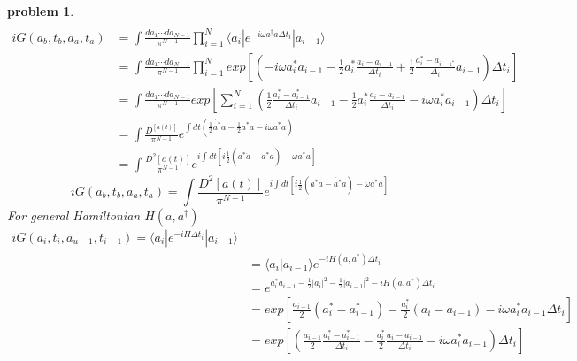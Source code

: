 \documentclass[a4paper,11pt]{article}
\newtheorem{problem}{problem}[subsection]
\begin{document}
\begin{problem}
\begin{equation*}
\begin{split}
    \end{split}
  \end{equation*}
\begin{equation*}
  \begin{split}
     iG(a_b,t_b,a_a,t_a)&=\int\frac{da_1\cdots da_{N-1}}{\pi^{N-1}}\prod_{i=1}^{N}\langle a_i|e^{-i\omega a^\dag a\Delta t_i}|a_{i-1}\rangle\\
       &=\int\frac{da_1\cdots da_{N-1}}{\pi^{N-1}}\prod_{i=1}^{N}exp\left[\left(-i\omega a_i^*a_{i-1}-\frac{1}{2}a_i^*\frac{a_i-a_{i-1}}{\Delta t_i}+\frac{1}{2}\frac{a_i^*-a_{i-1^*}}{\Delta_i}a_{i-1}\right)\Delta t_i\right]\\
       &=\int\frac{da_1\cdots da_{N-1}}{\pi^{N-1}}exp\left[\sum_{i=1}^{N}\left(\frac{1}{2}\frac{a_i^*-a_{i-1}^*}{\Delta t_i}a_{i-1}-\frac{1}{2}a_i^*\frac{a_i-a_{i-1}}{\Delta t_i}-i\omega a_i^*a_{i-1}\right)\Delta t_i\right]\\
       &=\int\frac{D^[a(t)]}{\pi^{N-1}}e^{\int dt(\frac{1}{2}\dot{a^*}a-\frac{1}{2}a^*\dot{a}-i\omega a^*a)}\\
       &=\int\frac{D^2[a(t)]}{\pi^{N-1}}e^{i\int dt\left[i\frac{1}{2}(a^*\dot{a}-\dot{a^*}a)-\omega a^*a\right]}
  \end{split}
\end{equation*}
\begin{equation*}
  iG(a_b,t_b,a_a,t_a)=\int\frac{D^2[a(t)]}{\pi^{N-1}}e^{i\int dt\left[i\frac{1}{2}(a^*\dot{a}-\dot{a^*}a)-\omega a^*a\right]}
\end{equation*}
For general Hamiltonian $H(a,a^\dag)$
\begin{equation*}
  \begin{split}
     iG(a_i,t_i,a_{u-1},t_{i-1})=\langle a_i|e^{-iH\Delta t_i}|a_{i-1}\rangle\\
       &=\langle a_i|a_{i-1}\rangle e^{-iH(a,a^*)\Delta t_i}\\
       &=e^{a_{i}^*a_{i-1}-\frac{1}{2}|a_i|^2-\frac{1}{2}|a_{i-1}|^2-iH(a,a^*)\Delta t_i}\\
       &=exp\left[\frac{a_{i-1}}{2}(a_i^*-a_{i-1}^*)-\frac{a_i^*}{2}(a_i-a_{i-1})-i\omega a_i^*a_{i-1}\Delta t_i\right]\\
       &=exp\left[\left(\frac{a_{i-1}}{2}\frac{a_i^*-a_{i-1}^*}{\Delta t_i}-\frac{a_i^*}{2}\frac{a_i-a_{i-1}}{\Delta t_i}-i\omega a_i^*a_{i-1}\right)\Delta t_i\right]
  \end{split}
\end{equation*}
\begin{equation*}
  \begin{split}

\end{split}
\end{equation*}
\end{problem}
\end{document}
